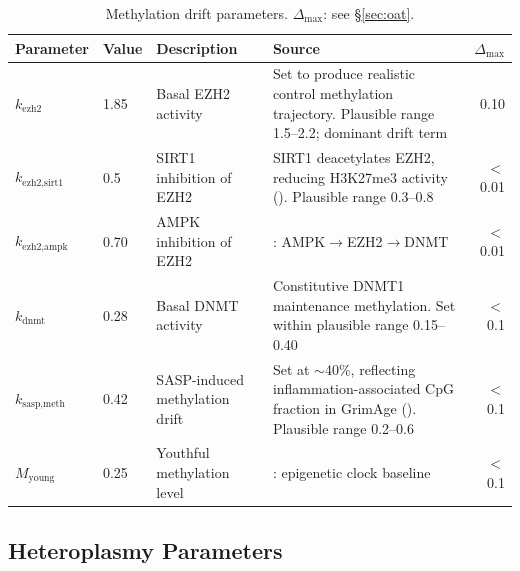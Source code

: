\documentclass[11pt]{article}
\begin{document}
\begin{table}[H]
\centering
\caption{Methylation drift parameters. $\Delta_{\max}$: see \S\ref{sec:oat}.}
\begin{tabular}{|ll|p{3cm}|p{6cm}|r|}
\hline
Parameter & Value & Description & Source & $\Delta_{\max}$ \\
\hline
$k_{\text{ezh2}}$ & 1.85 & Basal EZH2 activity & Set to produce realistic control methylation trajectory. Plausible range 1.5--2.2; dominant drift term & 0.10 \\
\hline
$k_{\text{ezh2,sirt1}}$ & 0.5 & SIRT1 inhibition of EZH2 & SIRT1 deacetylates EZH2, reducing H3K27me3 activity (\citet{Vire2006}). Plausible range 0.3--0.8 & $<$0.01 \\
\hline
$k_{\text{ezh2,ampk}}$ & 0.70 & AMPK inhibition of EZH2 & \citet{Vire2006}: AMPK$\to$EZH2$\to$DNMT & $<$0.01 \\
\hline
$k_{\text{dnmt}}$ & 0.28 & Basal DNMT activity & Constitutive DNMT1 maintenance methylation. Set within plausible range 0.15--0.40 & $<$0.1 \\
\hline
$k_{\text{sasp,meth}}$ & 0.42 & SASP-induced methylation drift & Set at $\sim$40\%, reflecting inflammation-associated CpG fraction in GrimAge (\citet{Lu2019}). Plausible range 0.2--0.6 & $<$0.1 \\
\hline
$M_{\text{young}}$ & 0.25 & Youthful methylation level & \citet{Horvath2013}: epigenetic clock baseline & $<$0.1 \\
\hline
\end{tabular}
\end{table}

\subsection{Heteroplasmy Parameters}
\end{document}
